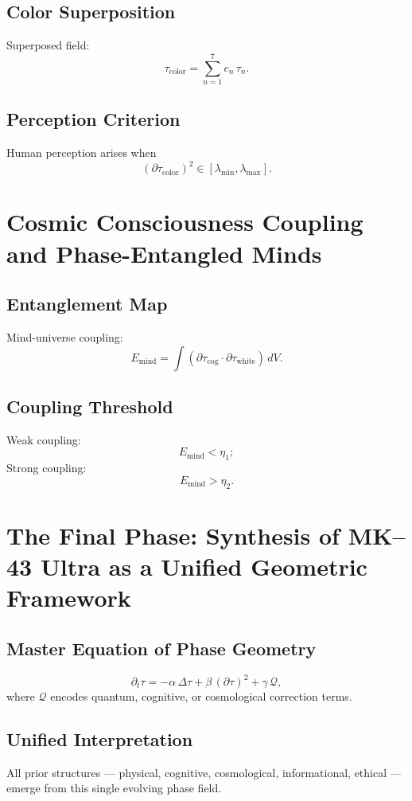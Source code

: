 \section{Color Superposition}
Superposed field:
\[
\tau_{\mathrm{color}} = \sum_{n=1}^7 c_n\,\tau_n.
\]

\section{Perception Criterion}
Human perception arises when
\[
(\partial\tau_{\mathrm{color}})^2 \in [\lambda_{\min},\lambda_{\max}].
\]

\chapter{Cosmic Consciousness Coupling and Phase-Entangled Minds}

\section{Entanglement Map}
Mind-universe coupling:
\[
E_{\mathrm{mind}} = \int (\partial\tau_{\mathrm{cog}} \cdot \partial\tau_{\mathrm{white}})\, dV.
\]

\section{Coupling Threshold}
Weak coupling:
\[
E_{\mathrm{mind}} < \eta_1;
\]
Strong coupling:
\[
E_{\mathrm{mind}} > \eta_2.
\]

\chapter{The Final Phase: Synthesis of MK--43 Ultra as a Unified Geometric Framework}

\section{Master Equation of Phase Geometry}
\[
\partial_t \tau = -\alpha\,\Delta\tau + \beta\,(\partial\tau)^2 + \gamma\,\mathcal{Q},
\]
where \(\mathcal{Q}\) encodes quantum, cognitive, or cosmological correction terms.

\section{Unified Interpretation}
All prior structures --- physical, cognitive, cosmological, informational, ethical --- emerge from this single evolving phase field.

